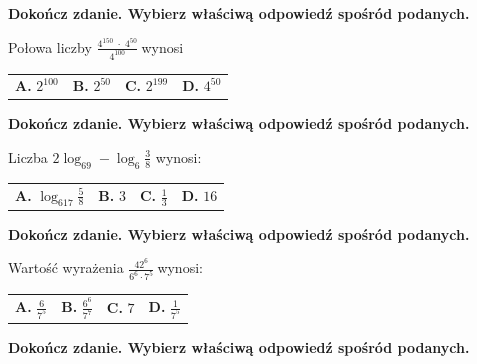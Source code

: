 \documentclass[12pt,a4paper]{article}
\theoremstyle{break}
\begin{document}
	
	\begin{zad}[0-1]
		\textbf{Dokończ zdanie. Wybierz właściwą odpowiedź spośród podanych.}
	\end{zad} 
	
	Połowa liczby \Large$\frac{4^{150}\;\cdot\;4^{50}}{4^{100}}\:$\normalsize wynosi
	
	\vspace{0.5cm}
	\begin{tabular}{p{3.5cm} p{3.5cm} p{3.5cm} p{3.5cm}}
		\textbf{A. }$2^{100}$&
		\textbf{B. }$2^{50}$&
		\textbf{C. }$2^{199}$&
		\textbf{D. }$4^{50}$\\
	\end{tabular}
	
	
	\begin{zad}[0-1]
		\textbf{Dokończ zdanie. Wybierz właściwą odpowiedź spośród podanych.}
	\end{zad} 
	
	Liczba $2\log_69-\log_6\frac{3}{8}$ wynosi:
	
	\vspace{0.5cm}
	\begin{tabular}{p{3.5cm} p{3.5cm} p{3.5cm} p{3.5cm}}
		\textbf{A. }$\log_617\frac{5}{8}$&
		\textbf{B. }$3$&
		\textbf{C. }$\frac{1}{3}$&
		\textbf{D. }$16$\\
	\end{tabular}
	
	
	\begin{zad}[0-1]
		\textbf{Dokończ zdanie. Wybierz właściwą odpowiedź spośród podanych.}
	\end{zad} 
	
	Wartość wyrażenia \large$\frac{42^6}{6^6\cdot7^5}\:$\normalsize wynosi:
	
	\vspace{0.5cm}
	\begin{tabular}{p{3.5cm} p{3.5cm} p{3.5cm} p{3.5cm}}
		\textbf{A. }$\frac{6}{7^5}$&
		\textbf{B. }$\frac{6^6}{7^7}$&
		\textbf{C. }$7$&
		\textbf{D. }$\frac{1}{7^5}$\\
	\end{tabular}

	
	\begin{zad}[0-1]
		\textbf{Dokończ zdanie. Wybierz właściwą odpowiedź spośród podanych.}
	\end{zad} 
	
\end{document}
